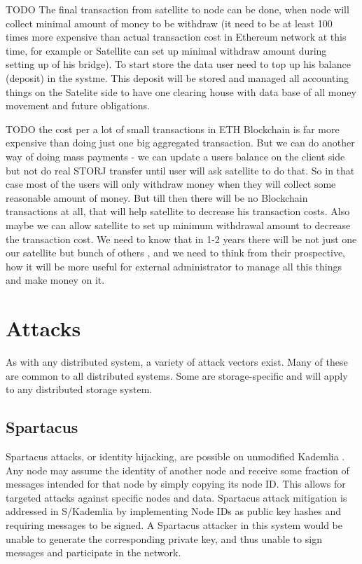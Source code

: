 \documentclass[11pt,fleqn,openany]{book}
\newcommand{\todo}[1]{{\color{red} TODO #1 }}
\begin{document}
\todo{
The final transaction from satellite to node can be done, when node will collect minimal amount of money to be withdraw (it need to be at least 100 times more expensive than actual transaction cost in Ethereum network at this time, for example or Satellite can set up minimal withdraw amount during setting up of his bridge).
To start store the data user need to top up his balance (deposit) in the systme. This deposit will be stored and managed all accounting things on the Satelite side to have one clearing house with data base of all money movement and future obligations.
}

\todo{the cost per a lot of small transactions in ETH Blockchain is far more expensive than doing just one big aggregated transaction.
But we can do another way of doing mass payments - we can update a users balance on the client side but not do real STORJ transfer until user will ask satellite to do that. So in that case most of the users will only withdraw money when they will collect some reasonable amount of money. But till then there will be no Blockchain transactions at all, that will help satellite to decrease his transaction costs. Also maybe we can allow satellite to set up minimum withdrawal amount to decrease the transaction cost.
We need to know that in 1-2 years there will be not just one our satellite but bunch of others , and we need to think from their prospective, how it will be more useful for external administrator to manage all this things and make money on it.
}
\newpage \appendix

\chapter{Attacks}

As with any distributed system, a variety of attack vectors exist. Many of these
are common to all distributed systems. Some are storage-specific and will apply
to any distributed storage system.

\section{Spartacus}

Spartacus attacks, or identity hijacking, are possible on unmodified Kademlia
\cite{kademlia}.
Any node may assume the identity of another node and receive some fraction of
messages intended for that node by simply copying its node ID.
This allows for targeted attacks against specific nodes and data.
Spartacus attack mitigation is addressed in S/Kademlia \cite{s-kademlia} by
implementing Node IDs as public key hashes and requiring messages to be signed.
A Spartacus attacker in this system would be unable to generate the
corresponding private key, and thus unable to sign messages and participate in
the network.
\end{document}

